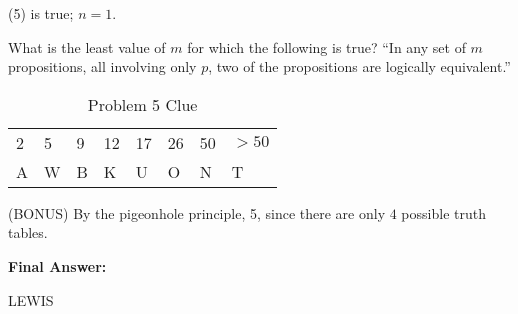 \documentclass[solution, letterpaper]{cs20inclass}
\begin{document}
\begin{solution}
(5) is true; $n = 1$.
\end{solution}

\problem What is the least value of $m$ for which the following is true? ``In any set of $m$ propositions, all involving only $p$, two of the propositions are logically equivalent.''

\begin{table}[h]
\centering
\begin{tabular}{llllllll}
2 & 5 & 9 & 12 & 17 & 26 & 50 & $>50$ \\
A & W & B & K & U & O & N & T
\end{tabular}
\caption{Problem 5 Clue}
\end{table}

\begin{solution}
(BONUS) By the pigeonhole principle, 5, since there are only $4$ possible truth tables.
\end{solution}

\problem \textbf{Final Answer: }

\begin{solution}
LEWIS
\end{solution}
\end{document}
